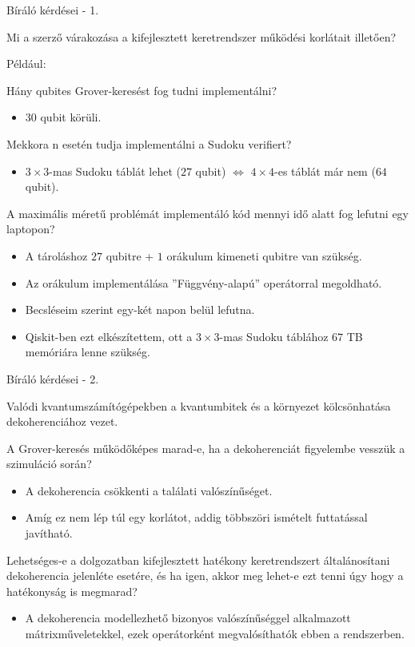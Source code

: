 \documentclass[aspectratio=169]{beamer}
\begin{document}
\begin{frame}{Bíráló kérdései - 1.}

Mi a szerző várakozása a kifejlesztett keretrendszer működési korlátait illetően?

Például:

Hány qubites Grover-keresést fog tudni implementálni?
\begin{itemize}
  \item 30 qubit körüli.
\end{itemize}
Mekkora n esetén tudja implementálni a Sudoku verifiert?
\begin{itemize}
  \item $3\times{}3$-mas Sudoku táblát lehet ($27$ qubit) $\Leftrightarrow$ $4\times{}4$-es táblát már nem ($64$ qubit).
\end{itemize}
A maximális méretű problémát implementáló kód mennyi idő alatt fog lefutni egy laptopon?
\begin{itemize}
  \item A tároláshoz $27$ qubitre + $1$ orákulum kimeneti qubitre van szükség.
  \item Az orákulum implementálása ''Függvény-alapú'' operátorral megoldható.
  \item Becsléseim szerint egy-két napon belül lefutna.
  \item Qiskit-ben ezt elkészítettem, ott a $3\times{}3$-mas Sudoku táblához $67$ TB memóriára lenne szükség.
\end{itemize}
\end{frame}

\begin{frame}{Bíráló kérdései - 2.}

Valódi kvantumszámítógépekben a kvantumbitek és a környezet kölcsönhatása dekoherenciához vezet.

A Grover-keresés működőképes marad-e, ha a dekoherenciát figyelembe vesszük a szimuláció során?
\begin{itemize}
  \item A dekoherencia csökkenti a találati valószínűséget.
  \item Amíg ez nem lép túl egy korlátot, addig többszöri ismételt futtatással javítható.
\end{itemize}
Lehetséges-e a dolgozatban kifejlesztett hatékony keretrendszert általánosítani dekoherencia jelenléte esetére, és ha igen, akkor meg lehet-e ezt tenni úgy hogy a hatékonyság is megmarad?
\begin{itemize}
  \item A dekoherencia modellezhető bizonyos valószínűséggel alkalmazott mátrixműveletekkel, ezek operátorként megvalósíthatók ebben a rendszerben.
\end{itemize}

\end{frame}
\end{document}
